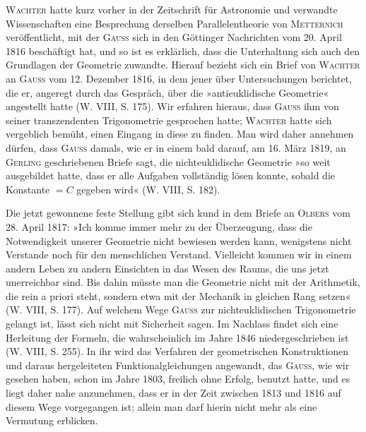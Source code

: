 \textsc{Wachter} hatte kurz vorher in der Zeitschrift für Astronomie und verwandte
Wissenschaften eine Besprechung derselben Parallelentheorie von \textsc{Metternich}
veröffentlicht, mit der \textsc{Gauss} sich in den Göttinger Nachrichten vom 20. April
1816 beschäftigt hat, und so ist es erklärlich, dass die Unterhaltung sich auch
den Grundlagen der Geometrie zuwandte. Hierauf bezieht sich ein Brief von
\textsc{Wachter} an \textsc{Gauss} vom 12. Dezember 1816, in dem jener über Untersuchungen
berichtet, die er, angeregt durch das Gespräch, über die »antieuklidische
Geometrie« angestellt hatte (W. VIII, S. 175). Wir erfahren
hieraus, dass \textsc{Gauss} ihm von seiner transzendenten Trigonometrie gesprochen
hatte; \textsc{Wachter} hatte sich vergeblich bemüht, einen Eingang in diese zu
finden. Man wird daher annehmen dürfen, dass \textsc{Gauss} damals, wie er in
einem bald darauf, am 16. März 1819, an \textsc{Gerling} geschriebenen Briefe sagt,
die nichteuklidische Geometrie »so weit ausgebildet hatte, dass er alle Aufgaben
vollständig lösen konnte, sobald die Konstante \(=C\) gegeben wird«
(W. VIII, S. 182).
\par
Die jetzt gewonnene feste Stellung gibt sich kund in dem Briefe an
\textsc{Olbers} vom 28. April 1817: »Ich komme immer mehr zu der Überzeugung,
dass die Notwendigkeit unserer Geometrie nicht bewiesen werden kann, wenigstens
nicht  Verstande noch für den menschlichen Verstand.
Vielleicht kommen wir in einem andern Leben zu andern Einsichten
in das Wesen des Raums, die uns jetzt unerreichbar sind. Bis dahin müsste
man die Geometrie nicht mit der Arithmetik, die rein a priori steht, sondern
etwa mit der Mechanik in gleichen Rang setzen« (W. VIII, S. 177).
\clearpage{}
\noindent\hspace*{\parindent}Auf welchem Wege \textsc{Gauss} zur nichteuklidischen Trigonometrie gelangt
ist, lässt sich nicht mit Sicherheit sagen. Im Nachlass findet sich eine Herleitung
der Formeln, die wahrscheinlich im Jahre 1846 niedergeschrieben ist
(W. VIII, S. 255). In ihr wird das Verfahren der geometrischen Konstruktionen
und daraus hergeleiteten Funktionalgleichungen angewandt, das \textsc{Gauss},
wie wir gesehen haben, schon im Jahre 1803, freilich ohne Erfolg, benutzt
hatte, und es liegt daher nahe anzunehmen, dass er in der Zeit zwischen 1813
und 1816 auf diesem Wege vorgegangen ist; allein man darf hierin nicht
mehr als eine Vermutung erblicken.
\clearpage\endgroup
